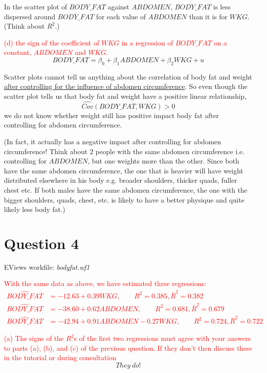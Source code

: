 \documentclass[12pt]{report}
\begin{document}
\noindent In the scatter plot of $BODY\_FAT$ against $ABDOMEN$, $BODY\_FAT$ is less dispersed around $\overline{BODY\_FAT}$ for each value of $ABDOMEN$ than it is for $WKG$. (Think about $R^2$.)

\noindent \textcolor{red}{(d) the sign of the coefficient of $WKG$ in a regression of $BODY\_FAT$ on a constant, $ABDOMEN$ and $WKG$.} $$BODY\_FAT = \beta_0 + \beta_1 ABDOMEN + \beta_2 WKG + u$$

\noindent Scatter plots cannot tell us anything about the correlation of body fat and weight \uline{after controlling for the influence of abdomen circumference}. So even though the scatter plot tells us that body fat and weight have a positive linear relationship, $$\widehat{Cov}(BODY\_FAT,WKG) > 0$$ we do not know whether weight still has positive impact body fat after controlling for abdomen circumference.

\noindent (In fact, it actually has a negative impact after controlling for abdomen circumference! Think about 2 people with the same abdomen circumference i.e. controlling for $ABDOMEN$, but one weights more than the other. Since both have the same abdomen circumference, the one that is heavier will have weight distributed elsewhere in his body e.g. broader shoulders, thicker quads, fuller chest etc. If both males have the same abdomen circumference, the one with the bigger shoulders, quads, chest, etc. is likely to have a better physique and quite likely less body fat.)

\newpage
\section*{Question 4 }
\noindent EViews workfile: \textit{bodyfat.wf1}

\noindent \textcolor{red}{With the same data as above, we have estimated three regressions: \begin{align*}
		\widehat{BODY\_FAT} &= -12.63 + 0.39WKG, \qquad R^2 = 0.385, \bar{R}^2 = 0.382 \\
		\widehat{BODY\_FAT} &= -38.60 + 0.62ABDOMEN, \qquad R^2 = 0.681, \bar{R}^2 = 0.679 \\
		\widehat{BODY\_FAT} &= -42.94 + 0.91ABDOMEN - 0.27WKG, \qquad R^2 = 0.724, \bar{R}^2 = 0.722
	\end{align*}}

\noindent \textcolor{red}{(a) The signs of the $R^2$s of the first two regressions must agree with your answers to parts (a), (b), and (c) of the previous question. If they don't then discuss these in the tutorial or during consultation} $$They\ do!$$
\end{document}
